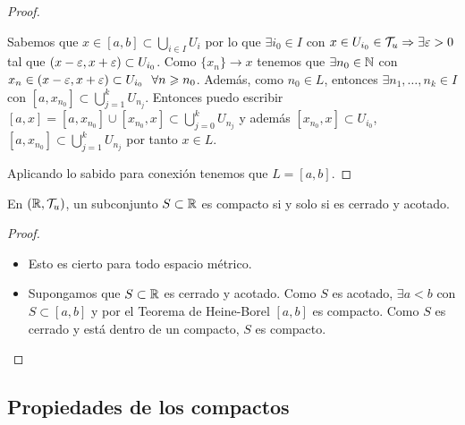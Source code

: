 \begin{teo}
\begin{proof}
\begin{enumerate}
            Sabemos que $x\in [a,b]\subset \bigcup\limits_{i\in I}U_i$ por lo que $\exists i_0\in I$ con $x\in U_{i_0}\in \mathcal{T}_u \Rightarrow \exists \varepsilon >0$ tal que $(x-\varepsilon, x+\varepsilon)\subset U_{i_0}$. Como $\{x_n\}\to x$ tenemos que $\exists n_0\in \mathbb{N}$ con $x_n\in (x-\veps, x+\veps)\subset U_{i_0}\ \ \forall n\geq n_0$. Además, como $n_0\in L$, entonces $\exists n_1,\dots,n_k\in I$ con $[a,x_{n_0}]\subset \bigcup\limits_{j=1}^k U_{n_j}$. Entonces puedo escribir $[a,x]=[a,x_{n_0}]\cup[x_{n_0}, x]\subset \bigcup\limits_{j=0}^k U_{n_j}$ y además $[x_{n_0},x]\subset U_{i_0}$, $[a,x_{n_0}]\subset \bigcup\limits_{j=1}^k U_{n_j}$ por tanto $x\in L$.

        \end{enumerate}
        Aplicando lo sabido para conexión tenemos que $L=[a,b]$.

    \end{proof}
\end{teo}

\begin{coro}
    En $(\mathbb{R}, \mathcal{T}_u)$, un subconjunto $S\subset \mathbb{R}$ es compacto si y solo si es cerrado y acotado.
    \begin{proof}\
        \begin{itemize}
            \item[$\Rightarrow$ )] Esto es cierto para todo espacio métrico.
            \item[$\Leftarrow$ )] Supongamos que $S\subset \mathbb{R}$ es cerrado y acotado. Como $S$ es acotado, $\exists a<b$ con $S\subset [a,b]$ y por el Teorema de Heine-Borel $[a,b]$ es compacto. Como $S$ es cerrado y está dentro de un compacto, $S$ es compacto. 
        \end{itemize}
    \end{proof}
\end{coro}

\subsection{Propiedades de los compactos}

